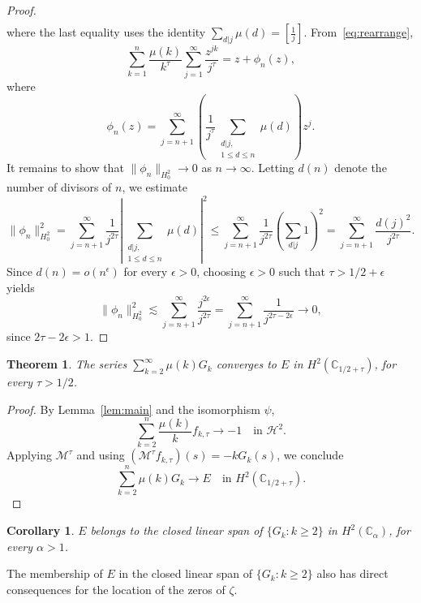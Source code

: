 \documentclass[11pt]{extarticle}
\numberwithin{equation}{section}
\theoremstyle{plain}
\newtheorem{theorem}{Theorem}[section]
\newtheorem{corollary}{Corollary}[section]
\theoremstyle{definition}
\begin{document}
\begin{proof}
\begin{align}
\end{align}
where the last equality uses the identity $\sum_{d|j}\mu(d) = \left[\frac{1}{j}\right]$. From~\eqref{eq:rearrange},
\[
\sum_{k=1}^{n} \frac{\mu(k)}{k^\tau} \sum_{j=1}^{\infty}\frac{z^{jk}}{j^\tau} = z + \phi_n(z),
\]
where
\[
\phi_n(z) = \sum_{j=n+1}^{\infty} \left(\frac{1}{j^\tau}\sum_{\substack{d|j,\\ 1\leq d\leq n}}\mu(d)\right) z^j.
\]
It remains to show that $\|\phi_n\|_{H^2_0} \to 0$ as $n \to \infty$. 
Letting $d(n)$ denote the number of divisors of $n$, we estimate
\[
\|\phi_n\|^2_{H^2_0} = \sum_{j=n+1}^{\infty} \frac{1}{j^{2\tau}}\left|\sum_{\substack{d|j,\\ 1\leq d\leq n}}\mu(d)\right|^2 
\leq \sum_{j=n+1}^{\infty} \frac{1}{j^{2\tau}}\left(\sum_{d|j}1\right)^2
= \sum_{j=n+1}^{\infty} \frac{d(j)^2}{j^{2\tau}}.
\]
Since $d(n) = o(n^\epsilon)$ for every $\epsilon > 0$, choosing $\epsilon > 0$
such that $\tau > 1/2 + \epsilon$ yields
\[
\|\phi_n\|^2_{H^2_0} \lesssim \sum_{j=n+1}^{\infty} \frac{j^{2\epsilon}}{j^{2\tau}} 
= \sum_{j=n+1}^{\infty} \frac{1}{j^{2\tau - 2\epsilon}} \longrightarrow 0,
\]
since $2\tau - 2\epsilon > 1$.
\end{proof}

\begin{theorem}\label{main-teo}
The series $\sum_{k=2}^{\infty} \mu(k) G_k$ converges to $E$ in 
$H^2(\mathbb{C}_{1/2+\tau})$, for every $\tau > 1/2$.
\end{theorem}

\begin{proof}
By Lemma~\ref{lem:main} and the isomorphism $\psi$,
\[
\sum_{k=2}^{n} \frac{\mu(k)}{k} f_{k,\tau} \longrightarrow -1 \quad \text{in } \mathcal{H}^2.
\]
Applying $\mathcal{M}^\tau$ and using $(\mathcal{M}^\tau f_{k,\tau})(s) = -kG_k(s)$, we conclude
\begin{equation}\label{eq:main-conv}
\sum_{k=2}^{n} \mu(k) G_k \longrightarrow E \quad \text{in } H^2(\mathbb{C}_{1/2+\tau}).
\end{equation}
\end{proof}

\begin{corollary}\label{cor:main}
$E$ belongs to the closed linear span of $\{G_k : k \geq 2\}$ in 
$H^2(\mathbb{C}_\alpha)$, for every $\alpha > 1$.
\end{corollary}

The membership of $E$ in the closed linear span of $\{G_k : k \geq 2\}$ also has
direct consequences for the location of the zeros of $\zeta$.
\end{document}

